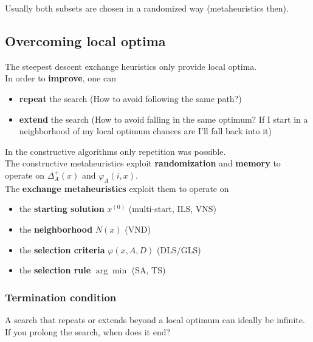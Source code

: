 Usually both subsets are chosen in a randomized way (metaheuristics then). \\


\newpage

\subsection{Overcoming local optima}
The steepest descent exchange heuristics only provide local optima.\\

In order to \textbf{improve}, one can
\begin{itemize}
	\item \textbf{repeat} the search (How to avoid following the same path?)
	\item \textbf{extend} the search (How to avoid falling in the same optimum? If I start in a neighborhood of my local optimum chances are I'll fall back into it)
\end{itemize}

In the constructive algorithms only repetition was possible.\\

The constructive metaheuristics exploit \textbf{randomization} and \textbf{memory} to operate on $\Delta_A^+ (x)$ and $\varphi_A (i, x)$.\\

The \textbf{exchange metaheuristics} exploit them to operate on
\begin{itemize}
	\item the \textbf{starting solution} $x^{(0)}$ (multi-start, ILS, VNS)
	\item the \textbf{neighborhood} $N (x)$ (VND)
	\item the \textbf{selection criteria} $\varphi (x, A, D)$ (DLS/GLS)
	\item the \textbf{selection rule} $\arg \min$ (SA, TS)
\end{itemize}

\newpage

\subsubsection{Termination condition} 

A search that repeats or extends beyond a local optimum can ideally be infinite. If you prolong the search, when does it end? \\

